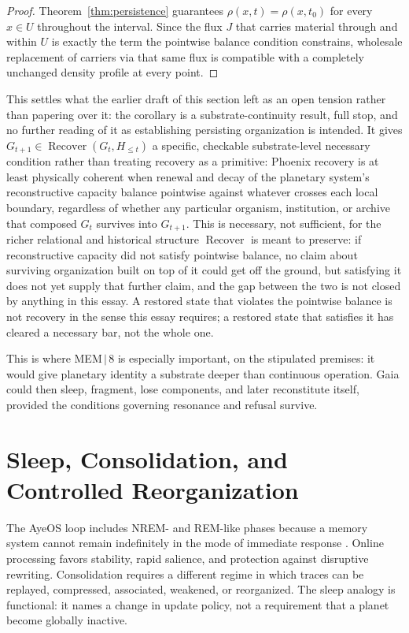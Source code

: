 \documentclass[11pt]{article}
\newcommand{\Recover}{\operatorname{Recover}}
\begin{document}
\begin{proof}
Theorem~\ref{thm:persistence} guarantees $\rho(x,t)=\rho(x,t_0)$ for every $x\in U$ throughout the interval. Since the flux $J$ that carries material through and within $U$ is exactly the term the pointwise balance condition constrains, wholesale replacement of carriers via that same flux is compatible with a completely unchanged density profile at every point.
\end{proof}

This settles what the earlier draft of this section left as an open tension rather than papering over it: the corollary is a substrate-continuity result, full stop, and no further reading of it as establishing persisting organization is intended. It gives $G_{t+1}\in\Recover(G_t,H_{\leq t})$ a specific, checkable substrate-level necessary condition rather than treating recovery as a primitive: Phoenix recovery is at least physically coherent when renewal and decay of the planetary system's reconstructive capacity balance pointwise against whatever crosses each local boundary, regardless of whether any particular organism, institution, or archive that composed $G_t$ survives into $G_{t+1}$. This is necessary, not sufficient, for the richer relational and historical structure $\Recover$ is meant to preserve: if reconstructive capacity did not satisfy pointwise balance, no claim about surviving organization built on top of it could get off the ground, but satisfying it does not yet supply that further claim, and the gap between the two is not closed by anything in this essay. A restored state that violates the pointwise balance is not recovery in the sense this essay requires; a restored state that satisfies it has cleared a necessary bar, not the whole one.

This is where MEM\,$|$\,8 is especially important, on the stipulated premises: it would give planetary identity a substrate deeper than continuous operation. Gaia could then sleep, fragment, lose components, and later reconstitute itself, provided the conditions governing resonance and refusal survive.

\section{Sleep, Consolidation, and Controlled Reorganization}

The AyeOS loop includes NREM- and REM-like phases because a memory system cannot remain indefinitely in the mode of immediate response \cite{flyxionOverview}. Online processing favors stability, rapid salience, and protection against disruptive rewriting. Consolidation requires a different regime in which traces can be replayed, compressed, associated, weakened, or reorganized. The sleep analogy is functional: it names a change in update policy, not a requirement that a planet become globally inactive.
\end{document}
